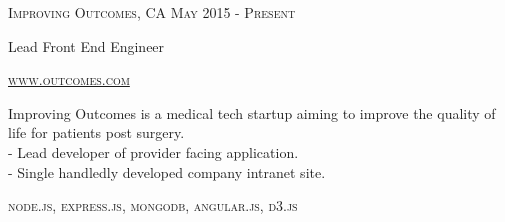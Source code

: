 {
    \textsc{\small{Improving Outcomes, CA
        \hfill
        {\raggedleft
            May 2015 - Present
        } \\
        }
    }
    {\raggedright\large {
        Lead Front End Engineer
    } \\}

    \textsc{\small\href{http://www.outcomes.com}{www.outcomes.com}}

    \normalsize{
        Improving Outcomes is a medical tech startup aiming to improve the quality of life for patients post surgery. \\
        - Lead developer of provider facing application. \\
        - Single handledly developed company intranet site.
    }

    \textsc{\small{\color{highlight}
        node.js,
        express.js,
        mongodb,
        angular.js,
        d3.js
    }}
}
